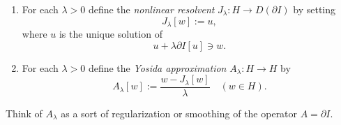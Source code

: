 \begin{definition}
\label{def:nonlinear-resolvent-yosida}
\begin{enumerate}
\item[(1)] For each $\lambda > 0$ define the \textit{nonlinear resolvent} $J_\lambda : H \to D(\partial I)$ by setting
\[
J_\lambda[w] := u,
\]
where $u$ is the unique solution of
\[
u + \lambda \partial I[u] \ni w.
\]
\item[(2)] For each $\lambda > 0$ define the \textit{Yosida approximation} $A_\lambda : H \to H$ by
\[
A_\lambda[w] := \frac{w - J_\lambda[w]}{\lambda} \quad (w \in H).
\tag{7}
\]
\end{enumerate}
Think of $A_\lambda$ as a sort of regularization or smoothing of the operator $A = \partial I$.
\end{definition}

